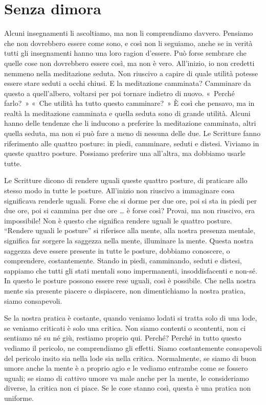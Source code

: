 \chapter{Senza dimora}

Alcuni insegnamenti li ascoltiamo, ma non li comprendiamo davvero.
Pensiamo che non dovrebbero essere come sono, e così non li seguiamo,
anche se in verità tutti gli insegnamenti hanno una loro ragion
d'essere. Può forse sembrare che quelle cose non dovrebbero essere così,
ma non è vero. All'inizio, io non credetti nemmeno nella meditazione
seduta. Non riuscivo a capire di quale utilità potesse essere stare
seduti a occhi chiusi. E la meditazione camminata? Camminare da questo a
quell'albero, voltarsi per poi tornare indietro di nuovo. «~Perché
farlo?~» «~Che utilità ha tutto questo camminare?~» È così che pensavo,
ma in realtà la meditazione camminata e quella seduta sono di grande
utilità. Alcuni hanno delle tendenze che li inducono a preferire la
meditazione camminata, altri quella seduta, ma non si può fare a meno di
nessuna delle due. Le Scritture fanno riferimento alle quattro posture:
in piedi, camminare, seduti e distesi. Viviamo in queste quattro
posture. Possiamo preferire una all'altra, ma dobbiamo usarle tutte.

Le Scritture dicono di rendere uguali queste quattro posture, di
praticare allo stesso modo in tutte le posture. All'inizio non riuscivo
a immaginare cosa significava renderle uguali. Forse che si dorme per
due ore, poi si sta in piedi per due ore, poi si cammina per due ore \ldots{}
è forse così? Provai, ma non riuscivo, era impossibile! Non è questo che
significa rendere uguali le quattro posture. ``Rendere uguali le
posture'' si riferisce alla mente, alla nostra presenza mentale,
significa far sorgere la saggezza nella mente, illuminare la mente.
Questa nostra saggezza deve essere presente in tutte le posture,
dobbiamo conoscere, o comprendere, costantemente. Stando in piedi,
camminando, seduti e distesi, sappiamo che tutti gli stati mentali sono
impermanenti, insoddisfacenti e non-sé. In questo le posture possono
essere rese uguali, così è possibile. Che nella nostra mente sia
presente piacere o dispiacere, non dimentichiamo la nostra pratica,
siamo consapevoli.

Se la nostra pratica è costante, quando veniamo lodati si tratta solo di
una lode, se veniamo criticati è solo una critica. Non siamo contenti o
scontenti, non ci sentiamo né su né giù, restiamo proprio qui. Perché?
Perché in tutto questo vediamo il pericolo, ne comprendiamo gli effetti.
Siamo costantemente consapevoli del pericolo insito sia nella lode sia
nella critica. Normalmente, se siamo di buon umore anche la mente è a
proprio agio e le vediamo entrambe come se fossero uguali; se siamo di
cattivo umore va male anche per la mente, le consideriamo diverse, la
critica non ci piace. Se le cose stanno così, questa è una pratica non
uniforme.

